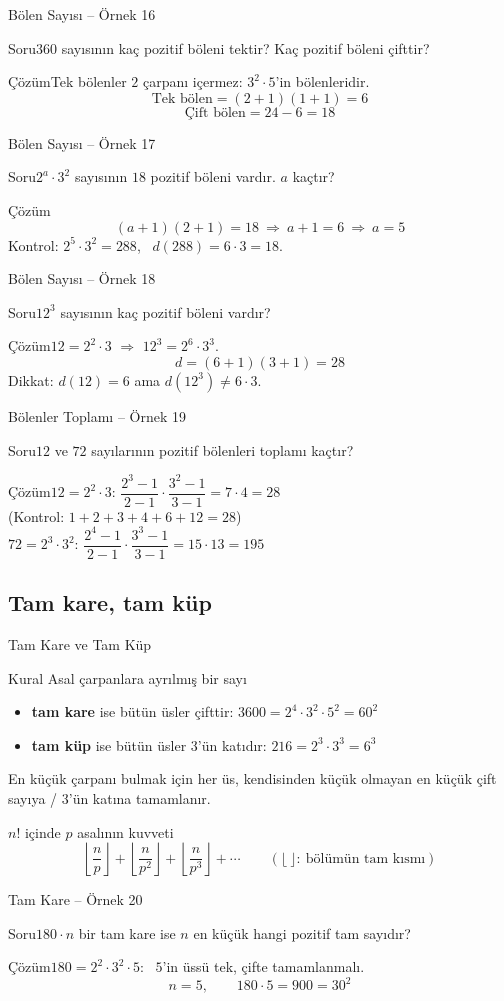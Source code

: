 \documentclass[aspectratio=169,11pt]{beamer}
\newcommand{\soru}[3]{%
\begin{frame}{#1}
  \begin{block}{Soru}\large #2\end{block}
  \pause
  \begin{exampleblock}{Çözüm}\large #3\end{exampleblock}
\end{frame}}
\begin{document}
\soru{Bölen Sayısı -- Örnek 16}
{\(360\) sayısının kaç pozitif böleni tektir? Kaç pozitif böleni çifttir?}
{Tek bölenler \(2\) çarpanı içermez: \(3^2\cdot 5\)'in bölenleridir.
\[\text{Tek bölen}=(2+1)(1+1)=6\]
\[\text{Çift bölen}=24-6=18\]}

\soru{Bölen Sayısı -- Örnek 17}
{\(2^a\cdot 3^2\) sayısının \(18\) pozitif böleni vardır. \(a\) kaçtır?}
{\[(a+1)(2+1)=18\ \Rightarrow\ a+1=6\ \Rightarrow\ a=5\]
Kontrol: \(2^5\cdot 3^2=288\), \ \(d(288)=6\cdot 3=18\).}

\soru{Bölen Sayısı -- Örnek 18}
{\(12^3\) sayısının kaç pozitif böleni vardır?}
{\(12=2^2\cdot 3\) \(\Rightarrow\) \(12^3=2^6\cdot 3^3\).
\[d=(6+1)(3+1)=28\]
Dikkat: \(d(12)=6\) ama \(d(12^3)\neq 6\cdot 3\).}

\soru{Bölenler Toplamı -- Örnek 19}
{\(12\) ve \(72\) sayılarının pozitif bölenleri toplamı kaçtır?}
{\(12=2^2\cdot 3\): \quad \(\dfrac{2^3-1}{2-1}\cdot\dfrac{3^2-1}{3-1}=7\cdot 4=28\)\\[2pt]
{\normalsize (Kontrol: \(1+2+3+4+6+12=28\))}\\[4pt]
\(72=2^3\cdot 3^2\): \quad \(\dfrac{2^4-1}{2-1}\cdot\dfrac{3^3-1}{3-1}=15\cdot 13=195\)}

\subsection{Tam kare, tam küp}
\begin{frame}{Tam Kare ve Tam Küp}
\begin{block}{Kural}
Asal çarpanlara ayrılmış bir sayı
\begin{itemize}
\item \textbf{tam kare} ise bütün üsler çifttir: \(3600=2^4\cdot 3^2\cdot 5^2=60^2\)
\item \textbf{tam küp} ise bütün üsler \(3\)'ün katıdır: \(216=2^3\cdot 3^3=6^3\)
\end{itemize}
En küçük çarpanı bulmak için her üs, kendisinden küçük olmayan en küçük çift sayıya / \(3\)'ün katına tamamlanır.
\end{block}
\begin{block}{\(n!\) içinde \(p\) asalının kuvveti}
\[\left\lfloor\frac{n}{p}\right\rfloor+\left\lfloor\frac{n}{p^2}\right\rfloor+\left\lfloor\frac{n}{p^3}\right\rfloor+\cdots\qquad(\lfloor\ \rfloor:\ \text{bölümün tam kısmı})\]
\end{block}
\end{frame}

\soru{Tam Kare -- Örnek 20}
{\(180\cdot n\) bir tam kare ise \(n\) en küçük hangi pozitif tam sayıdır?}
{\(180=2^2\cdot 3^2\cdot 5\): \ \(5\)'in üssü tek, çifte tamamlanmalı.
\[n=5,\qquad 180\cdot 5=900=30^2\]}
\end{document}
